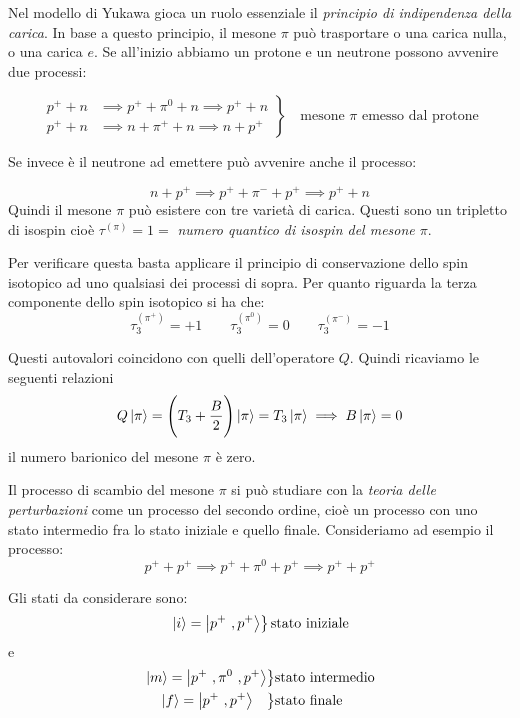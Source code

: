Nel modello di Yukawa gioca un ruolo essenziale il \textit{principio di indipendenza della carica}.
In base a questo principio, il mesone $\pi$ può trasportare o una carica nulla, o una carica $e$. 
Se all'inizio abbiamo un protone e un neutrone possono avvenire due processi:

\[
\left.
\begin{aligned}
p^+ + n &\implies p^+ + \pi^0 + n \implies p^+ + n \\
p^+ + n &\implies n + \pi^+ + n \implies n + p^+
\end{aligned}
\right\}
\quad
\text{mesone $\pi$ emesso dal protone}
\]

Se invece è il neutrone ad emettere può avvenire anche il processo:

\begin{equation*}
n + p^+ \implies p^+ + \pi^- + p^+ \implies p^+ + n 
\end{equation*}
Quindi il mesone $\pi$ può esistere con tre varietà di carica. Questi sono un
tripletto di isospin cioè $\tau^{(\pi)} = 1 =$ \textit{numero quantico di isospin
del mesone $\pi$}. 

Per verificare questa basta applicare il principio di conservazione dello spin
isotopico ad uno qualsiasi dei processi di sopra. Per quanto riguarda la terza
componente dello spin isotopico si ha che:
\begin{equation*}
  \tau_{3}^{(\pi^+)} = +1 \qquad \tau_{3}^{(\pi^0)} = 0 \qquad \tau_{3}^{(\pi^-)} = -1
\end{equation*}

Questi autovalori coincidono con quelli dell'operatore $Q$. Quindi ricaviamo le
seguenti relazioni
\begin{equation*}
Q\Ket{\pi} = \Biggl( T_3 + \dfrac{B}{2} \Biggr) \Ket{\pi} = T_3 \Ket{\pi} \implies B \Ket{\pi} = 0
\end{equation*}
il numero barionico del mesone $\pi$ è zero. 

Il processo di scambio del mesone $\pi$ si può studiare con la \textit{teoria
delle perturbazioni} come un processo del secondo ordine, cioè un processo con
uno stato intermedio fra lo stato iniziale e quello finale. Consideriamo ad
esempio il processo:
\begin{equation*}
p^+ + p^+ \implies p^+ + \pi^0 + p^+ \implies p^+ + p^+
\end{equation*}

Gli stati da considerare sono:
\[
\left.
\begin{aligned}
\Ket{i}= \Ket{p^+ \ , p^+}  
\end{aligned}
\right\}
\text{stato iniziale}
\]
e
\[
  \begin{aligned}
  \left. \begin{aligned}
	\Ket{m} = \Ket{p^+ \ , \pi^0 \ , p^+}
  \end{aligned}\right\} &\text{stato intermedio}\\
  \left.\begin{aligned}
    \Ket{f} &= \Ket{p^+ \ , p^+}
  \end{aligned}\right\} &\text{stato finale}
\end{aligned}
\]

